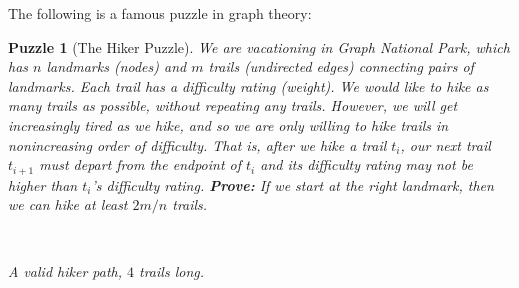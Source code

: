 \documentclass{article}\usepackage[a4paper,margin=20mm]{geometry}
\newtheorem{puzzle}[theorem]{Puzzle}
\begin{document}
The following is a famous puzzle in graph theory:

\begin{puzzle}[The Hiker Puzzle]\label{puzzle:hiker}
  We are vacationing in Graph National Park, which has $n$ landmarks (nodes) and $m$ trails (undirected edges) connecting pairs of landmarks.
Each trail has a difficulty rating (weight).
We would like to hike as many trails as possible, without repeating any trails.
However, we will get increasingly tired as we hike, and so we are only willing to hike trails in nonincreasing order of difficulty.
That is, after we hike a trail $t_i$, our next trail $t_{i+1}$ must depart from the endpoint of $t_i$ and its difficulty rating may not be higher than $t_i$'s difficulty rating.
\textbf{Prove:} If we start at the right landmark, then we can hike at least $2m/n$ trails.

\begin{center}

~

A valid hiker path, $4$ trails long.
\end{center}
\end{puzzle}

\end{document}
